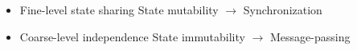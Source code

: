 \begin{itemize}
\item Fine-level state sharing
  \subitem State mutability $\to$ Synchronization
\item Coarse-level independence
  \subitem State immutability $\to$ Message-passing
\end{itemize}








